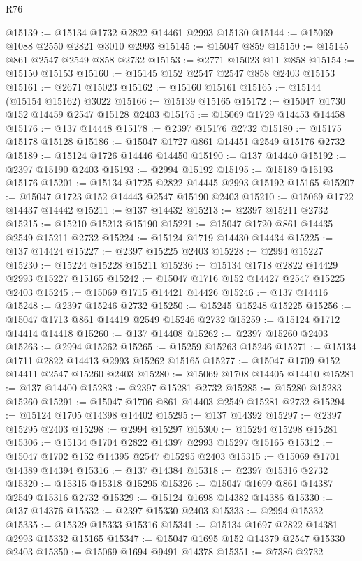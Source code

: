 \begin{lexlean}{R76}
\begin{coremodule}
@15139 := @15134 @1732 @2822 @14461 @2993 @15130
@15144 := @15069 @1088 @2550 @2821 @3010 @2993
@15145 := @15047 @859
@15150 := @15145 @861 @2547 @2549 @858 @2732
@15153 := @2771 @15023 @11 @858
@15154 := @15150 @15153
@15160 := @15145 @152 @2547 @2547 @858 @2403 @15153
@15161 := @2671 @15023
@15162 := @15160 @15161
@15165 := @15144 (@15154 @15162) @3022
@15166 := @15139 @15165
@15172 := @15047 @1730 @152 @14459 @2547 @15128 @2403
@15175 := @15069 @1729 @14453 @14458
@15176 := @137 @14448
@15178 := @2397 @15176 @2732
@15180 := @15175 @15178 @15128
@15186 := @15047 @1727 @861 @14451 @2549 @15176 @2732
@15189 := @15124 @1726 @14446 @14450
@15190 := @137 @14440
@15192 := @2397 @15190 @2403
@15193 := @2994 @15192
@15195 := @15189 @15193 @15176
@15201 := @15134 @1725 @2822 @14445 @2993 @15192 @15165
@15207 := @15047 @1723 @152 @14443 @2547 @15190 @2403
@15210 := @15069 @1722 @14437 @14442
@15211 := @137 @14432
@15213 := @2397 @15211 @2732
@15215 := @15210 @15213 @15190
@15221 := @15047 @1720 @861 @14435 @2549 @15211 @2732
@15224 := @15124 @1719 @14430 @14434
@15225 := @137 @14424
@15227 := @2397 @15225 @2403
@15228 := @2994 @15227
@15230 := @15224 @15228 @15211
@15236 := @15134 @1718 @2822 @14429 @2993 @15227 @15165
@15242 := @15047 @1716 @152 @14427 @2547 @15225 @2403
@15245 := @15069 @1715 @14421 @14426
@15246 := @137 @14416
@15248 := @2397 @15246 @2732
@15250 := @15245 @15248 @15225
@15256 := @15047 @1713 @861 @14419 @2549 @15246 @2732
@15259 := @15124 @1712 @14414 @14418
@15260 := @137 @14408
@15262 := @2397 @15260 @2403
@15263 := @2994 @15262
@15265 := @15259 @15263 @15246
@15271 := @15134 @1711 @2822 @14413 @2993 @15262 @15165
@15277 := @15047 @1709 @152 @14411 @2547 @15260 @2403
@15280 := @15069 @1708 @14405 @14410
@15281 := @137 @14400
@15283 := @2397 @15281 @2732
@15285 := @15280 @15283 @15260
@15291 := @15047 @1706 @861 @14403 @2549 @15281 @2732
@15294 := @15124 @1705 @14398 @14402
@15295 := @137 @14392
@15297 := @2397 @15295 @2403
@15298 := @2994 @15297
@15300 := @15294 @15298 @15281
@15306 := @15134 @1704 @2822 @14397 @2993 @15297 @15165
@15312 := @15047 @1702 @152 @14395 @2547 @15295 @2403
@15315 := @15069 @1701 @14389 @14394
@15316 := @137 @14384
@15318 := @2397 @15316 @2732
@15320 := @15315 @15318 @15295
@15326 := @15047 @1699 @861 @14387 @2549 @15316 @2732
@15329 := @15124 @1698 @14382 @14386
@15330 := @137 @14376
@15332 := @2397 @15330 @2403
@15333 := @2994 @15332
@15335 := @15329 @15333 @15316
@15341 := @15134 @1697 @2822 @14381 @2993 @15332 @15165
@15347 := @15047 @1695 @152 @14379 @2547 @15330 @2403
@15350 := @15069 @1694 @9491 @14378
@15351 := @7386 @2732

\end{coremodule}
\end{lexlean}
